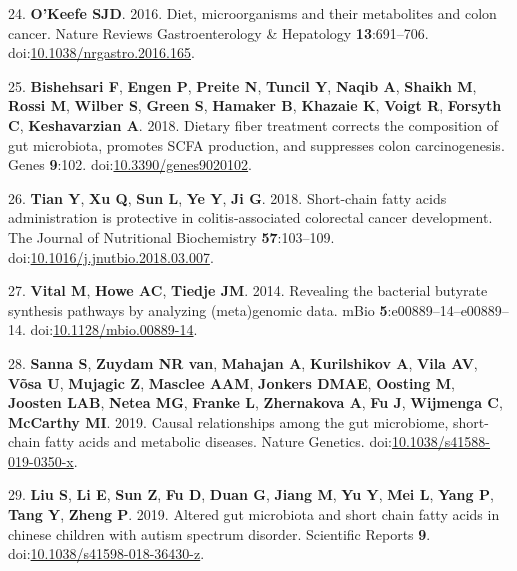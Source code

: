 \documentclass[11pt,]{article}
\begin{document}
\leavevmode\hypertarget{ref-OKeefe2016}{}%
24. \textbf{O'Keefe SJD}. 2016. Diet, microorganisms and their
metabolites and colon cancer. Nature Reviews Gastroenterology \&
Hepatology \textbf{13}:691--706.
doi:\href{https://doi.org/10.1038/nrgastro.2016.165}{10.1038/nrgastro.2016.165}.

\leavevmode\hypertarget{ref-Bishehsari2018}{}%
25. \textbf{Bishehsari F}, \textbf{Engen P}, \textbf{Preite N},
\textbf{Tuncil Y}, \textbf{Naqib A}, \textbf{Shaikh M}, \textbf{Rossi
M}, \textbf{Wilber S}, \textbf{Green S}, \textbf{Hamaker B},
\textbf{Khazaie K}, \textbf{Voigt R}, \textbf{Forsyth C},
\textbf{Keshavarzian A}. 2018. Dietary fiber treatment corrects the
composition of gut microbiota, promotes SCFA production, and suppresses
colon carcinogenesis. Genes \textbf{9}:102.
doi:\href{https://doi.org/10.3390/genes9020102}{10.3390/genes9020102}.

\leavevmode\hypertarget{ref-Tian2018}{}%
26. \textbf{Tian Y}, \textbf{Xu Q}, \textbf{Sun L}, \textbf{Ye Y},
\textbf{Ji G}. 2018. Short-chain fatty acids administration is
protective in colitis-associated colorectal cancer development. The
Journal of Nutritional Biochemistry \textbf{57}:103--109.
doi:\href{https://doi.org/10.1016/j.jnutbio.2018.03.007}{10.1016/j.jnutbio.2018.03.007}.

\leavevmode\hypertarget{ref-Vital2014}{}%
27. \textbf{Vital M}, \textbf{Howe AC}, \textbf{Tiedje JM}. 2014.
Revealing the bacterial butyrate synthesis pathways by analyzing
(meta)genomic data. mBio \textbf{5}:e00889--14--e00889--14.
doi:\href{https://doi.org/10.1128/mbio.00889-14}{10.1128/mbio.00889-14}.

\leavevmode\hypertarget{ref-Sanna2019}{}%
28. \textbf{Sanna S}, \textbf{Zuydam NR van}, \textbf{Mahajan A},
\textbf{Kurilshikov A}, \textbf{Vila AV}, \textbf{Võsa U},
\textbf{Mujagic Z}, \textbf{Masclee AAM}, \textbf{Jonkers DMAE},
\textbf{Oosting M}, \textbf{Joosten LAB}, \textbf{Netea MG},
\textbf{Franke L}, \textbf{Zhernakova A}, \textbf{Fu J},
\textbf{Wijmenga C}, \textbf{McCarthy MI}. 2019. Causal relationships
among the gut microbiome, short-chain fatty acids and metabolic
diseases. Nature Genetics.
doi:\href{https://doi.org/10.1038/s41588-019-0350-x}{10.1038/s41588-019-0350-x}.

\leavevmode\hypertarget{ref-Liu2019}{}%
29. \textbf{Liu S}, \textbf{Li E}, \textbf{Sun Z}, \textbf{Fu D},
\textbf{Duan G}, \textbf{Jiang M}, \textbf{Yu Y}, \textbf{Mei L},
\textbf{Yang P}, \textbf{Tang Y}, \textbf{Zheng P}. 2019. Altered gut
microbiota and short chain fatty acids in chinese children with autism
spectrum disorder. Scientific Reports \textbf{9}.
doi:\href{https://doi.org/10.1038/s41598-018-36430-z}{10.1038/s41598-018-36430-z}.
\end{document}
